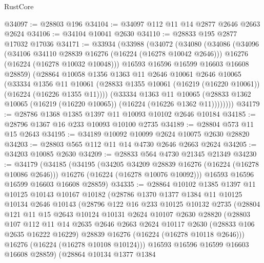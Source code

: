 \begin{lexlean}{RustCore}
\begin{coremodule}
@34097 := @28803 @196
@34104 := @34097 @112 @11 @14 @2877 @2646 @2663 @2624
@34106 := @34104 @10041 @2630
@34110 := @28833 @195 @2877 @17032 @17036
@34171 := @33934
    (@33988
      (@34072
        (@34080
          (@34086
            (@34096
              (@34106 @34110 @28839 @16276 (@16224 (@16278 @10042 @2646)))
              @16276
              (@16224 (@16278 @10032 @10048)))
            @16593
            @16596
            @16599
            @16603
            @16608
            @28859)
          (@28864
            @10058
            @1356
            @1363
            @11
            @2646
            @10061
            @2646
            @10065
            (@33334
              @1356
              @11
              @10061
              (@28833 @1355 @10061 (@16219 (@16220 @10061)) (@16224 (@16226 @1355 @11))))
            (@33334
              @1363
              @11
              @10065
              (@28833 @1362 @10065 (@16219 (@16220 @10065)) (@16224 (@16226 @1362 @11))))))))
@34179 := @28786 @1368 @1385 @1397 @11 @10093 @10102 @2646 @10184
@34185 := @28796 @1367 @16 @233 @10093 @10100 @2735
@34189 := @28804 @573 @11 @15 @2643
@34195 := @34189 @10092 @10099 @2624 @10075 @2630 @28820
@34203 := @28803 @565 @112 @11 @14 @4730 @2646 @2663 @2624
@34205 := @34203 @10085 @2630
@34209 := @28833 @564 @4730 @21345 @21349
@34230 := @34179
    (@34185
      (@34195
        (@34205 @34209 @28839 @16276 (@16224 (@16278 @10086 @2646)))
        @16276
        (@16224 (@16278 @10076 @10092)))
      @16593
      @16596
      @16599
      @16603
      @16608
      @28859)
@34335 := @28864
    @10102
    @1385
    @1397
    @11
    @10125
    @10143
    @10167
    @10182
    (@28786
      @1370
      @1377
      @1384
      @11
      @10125
      @10134
      @2646
      @10143
      (@28796
        @122
        @16
        @233
        @10125
        @10132
        @2735
        (@28804
          @121
          @11
          @15
          @2643
          @10124
          @10131
          @2624
          @10107
          @2630
          @28820
          (@28803
            @107
            @112
            @11
            @14
            @2635
            @2646
            @2663
            @2624
            @10117
            @2630
            (@28833 @106 @2635 @16222 @16229)
            @28839
            @16276
            (@16224 (@16278 @10118 @2646)))
          @16276
          (@16224 (@16278 @10108 @10124)))
        @16593
        @16596
        @16599
        @16603
        @16608
        @28859)
      (@28864
        @10134
        @1377
        @1384

\end{coremodule}
\end{lexlean}
